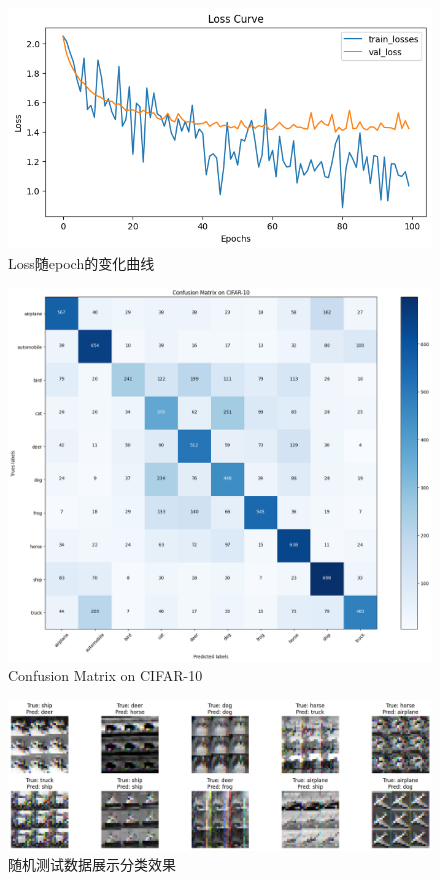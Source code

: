 \documentclass[12pt]{article}
\begin{document}
\begin{figure}[htbp]
  \centering
  \includegraphics[scale=0.75]{figures/nn/loss_curve.png}
  \caption{Loss随epoch的变化曲线}
  \label{fig:loss_curve}
\end{figure}


\begin{figure}[htbp]
  \centering
  \includegraphics[scale=0.5]{figures/nn/confusion_matrix.png}
  \caption{Confusion Matrix on CIFAR-10}
  \label{fig:confusion_matrix}
\end{figure}

\begin{figure}[htbp]
  \centering
  \includegraphics[scale=0.45]{figures/nn/random_result.png}
  \caption{随机测试数据展示分类效果}
  \label{fig:random_result}
\end{figure}
\end{document}
